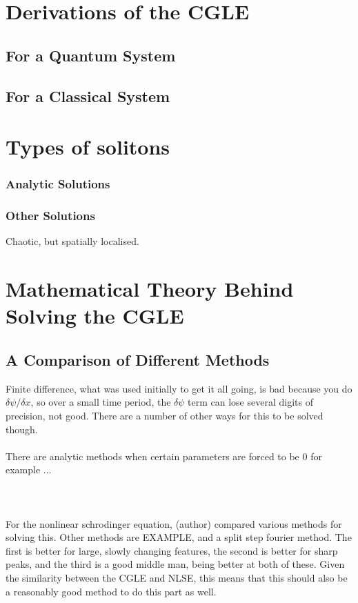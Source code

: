\documentclass[a4paper,12pt]{report}
\begin{document}
\chapter{Derivations of the CGLE}
\section{For a Quantum System}
\section{For a Classical System}












\chapter{Types of solitons}
\subsection{Analytic Solutions}

\subsection{Other Solutions}
Chaotic, but spatially localised.











\chapter{Mathematical Theory Behind Solving the CGLE}
\section{A Comparison of Different Methods}

Finite difference, what was used initially to get it all going, is bad because you do $\delta \psi / \delta x$, so over a small time period, the $\delta \psi$ term can lose several digits of precision, not good. There are a number of other ways for this to be solved though. 
\\\\
There are analytic methods when certain parameters are forced to be 0 for example ...
\\\\ 
\\\\
For the nonlinear schrodinger equation, (author) compared various methods for solving this. Other methods are EXAMPLE, and a split step fourier method. The first is better for large, slowly changing features, the second is better for sharp peaks, and the third is a good middle man, being better at both of these. 
Given the similarity between the CGLE and NLSE, this means that this should also be a reasonably good method to do this part as well. 
\end{document}
